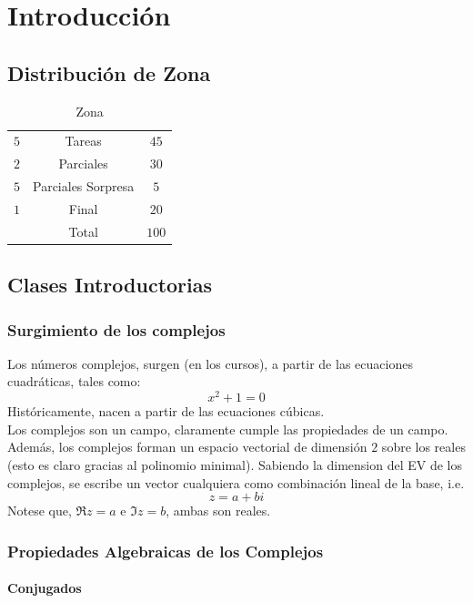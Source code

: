 \label{CLASE1}
\section{Introducción}
\subsection{Distribución de Zona}
\begin{table}[H]
	\centering
	\caption{Zona}
	\begin{tabular}{||c||c|c||}
		\hline
		\hline
		$5$ & Tareas & $45$ \\
		$2$ & Parciales & $30$ \\
		$5$ & Parciales Sorpresa & $5$ \\
		$1$ & Final & $20$ \\
		\hline
		 & Total & $100$ \\
		\hline
		\hline
	\end{tabular}
	\label{zonas}
\end{table}


\subsection{Clases Introductorias}
\subsubsection{Surgimiento de los complejos}

Los números complejos, surgen (en los cursos), a partir de las ecuaciones cuadráticas, tales como:
	$$x^2 + 1 = 0$$
Históricamente, nacen a partir de las ecuaciones cúbicas. \\

Los complejos son un campo, claramente cumple las propiedades de un campo. Además, los complejos forman un espacio vectorial de dimensión $2$ sobre los reales (esto es claro gracias al polinomio minimal). Sabiendo la dimension del EV de los complejos, se escribe un vector cualquiera como combinación lineal de la base, i.e.
	$$z = a+bi$$
Notese que, $\Re{z} = a$ e $\Im{z} = b$, ambas son reales.

\label{CLASE2}
\subsubsection{Propiedades Algebraicas de los Complejos}
\paragraph{Conjugados}

